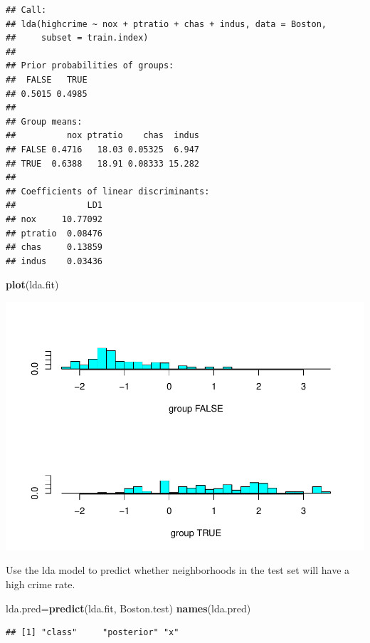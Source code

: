 \documentclass[
]{article}
\newenvironment{Shaded}{\begin{snugshade}}{\end{snugshade}}
\newcommand{\KeywordTok}[1]{\textcolor[rgb]{0.13,0.29,0.53}{\textbf{#1}}}
\newcommand{\NormalTok}[1]{#1}
\begin{document}
\begin{verbatim}
## Call:
## lda(highcrime ~ nox + ptratio + chas + indus, data = Boston, 
##     subset = train.index)
## 
## Prior probabilities of groups:
##  FALSE   TRUE 
## 0.5015 0.4985 
## 
## Group means:
##          nox ptratio    chas  indus
## FALSE 0.4716   18.03 0.05325  6.947
## TRUE  0.6388   18.91 0.08333 15.282
## 
## Coefficients of linear discriminants:
##              LD1
## nox     10.77092
## ptratio  0.08476
## chas     0.13859
## indus    0.03436
\end{verbatim}

\begin{Shaded}
\begin{Highlighting}[]
\KeywordTok{plot}\NormalTok{(lda.fit)}
\end{Highlighting}
\end{Shaded}

\includegraphics{4-13_files/figure-latex/unnamed-chunk-9-1.pdf}

Use the lda model to predict whether neighborhoods in the test set will
have a high crime rate.

\begin{Shaded}
\begin{Highlighting}[]
\NormalTok{lda.pred=}\KeywordTok{predict}\NormalTok{(lda.fit, Boston.test)}
\KeywordTok{names}\NormalTok{(lda.pred)}
\end{Highlighting}
\end{Shaded}

\begin{verbatim}
## [1] "class"     "posterior" "x"
\end{verbatim}
\end{document}
